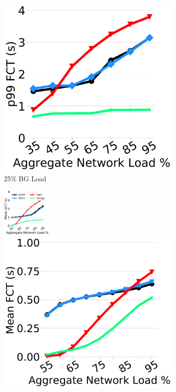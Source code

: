 \begin{figure}[th!]
\begin{subfigure}[t]{.32\linewidth}
	\includegraphics[width=0.85\linewidth]{figs/qps25tcpp99fct.pdf}
		\caption{\small{25\% BG Load}}
		\label{fig:qps25}
	\end{subfigure}
	\begin{subfigure}[t]{.32\linewidth}
	\centering
	\includegraphics[width=0.85\linewidth, height=2.4cm]{figs/qps50.pdf}
	\includegraphics[width=0.85\linewidth]{figs/qps50fct.pdf}

\end{subfigure}
\end{figure}
